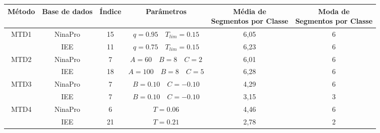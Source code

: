 \begin{table}[htb]
{
	\begin{tabular}{c|ccccc}
		\toprule
		Método 					& Base de dados	& Índice	& Parâmetros	&\pbox{2cm}{Média de \\ Segmentos por Classe}&\pbox{2cm}{Moda de \\ Segmentos por Classe}\\
		\midrule \midrule
		\multirow{2}{*}{MTD1}	& NinaPro		& 15 & $q = 0.95 \quad T_{lim} = 0.15$	&6,05&6\\
								& IEE			& 11 & $q = 0.75 \quad T_{lim} = 0.15$	&6,23&6\\
		\midrule                                                                             
		\multirow{2}{*}{MTD2}	& NinaPro		& 7	& $A = 60 \quad B = 8 \quad C = 2$	&6,01&6\\
								& IEE			& 18& $A = 100 \quad B = 8 \quad C = 5$	&6,28&6\\
		\midrule                                                                             
		\multirow{2}{*}{MTD3}	& NinaPro		& 7	& $B = 0.10 \quad C = -0.10$		&4,29&6\\
								& IEE			& 7 & $B = 0.10 \quad C = -0.10$		&3,15&3\\
		\midrule                                                                             
		\multirow{2}{*}{MTD4}	& NinaPro		& 6	& $T = 0.06$						&4,46&6\\
								& IEE			& 21& $T = 0.21$						&2,78&2\\
		\bottomrule
	\end{tabular}
}{}
\end{table}

